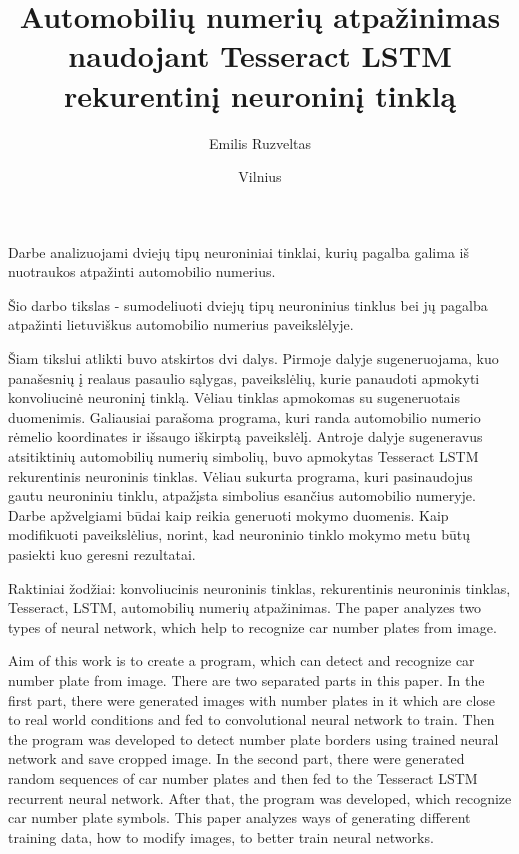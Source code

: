 \documentclass{VUMIFInfBakalaurinis}
\title{Automobilių numerių atpažinimas naudojant Tesseract LSTM rekurentinį neuroninį tinklą}
\author{Emilis Ruzveltas}
\date{Vilnius \\ \the\year}
\begin{document}
\maketitle
\setcounter{page}{2}
Darbe analizuojami dviejų tipų neuroniniai tinklai, kurių pagalba galima iš nuotraukos atpažinti automobilio numerius.

Šio darbo tikslas - sumodeliuoti dviejų tipų neuroninius tinklus bei jų pagalba atpažinti lietuviškus automobilio numerius paveikslėlyje.

Šiam tikslui atlikti buvo atskirtos dvi dalys. Pirmoje dalyje sugeneruojama, kuo panašesnių į realaus pasaulio sąlygas,
paveikslėlių, kurie panaudoti apmokyti konvoliucinė neuroninį tinklą. Vėliau tinklas apmokomas su sugeneruotais duomenimis.
Galiausiai parašoma programa, kuri randa automobilio numerio rėmelio koordinates ir išsaugo iškirptą paveikslėlį.
Antroje dalyje sugeneravus atsitiktinių automobilių numerių simbolių, buvo apmokytas Tesseract LSTM rekurentinis neuroninis
tinklas. Vėliau sukurta programa, kuri pasinaudojus gautu neuroniniu tinklu, atpažįsta simbolius esančius automobilio numeryje.
Darbe apžvelgiami būdai kaip reikia generuoti mokymo duomenis. Kaip modifikuoti paveikslėlius, norint,
kad neuroninio tinklo mokymo metu būtų pasiekti kuo geresni rezultatai.

Raktiniai žodžiai: konvoliucinis neuroninis tinklas, rekurentinis neuroninis tinklas, Tesseract, LSTM, automobilių numerių atpažinimas.
\newpage
{}
The paper analyzes two types of neural network, which help to recognize car number plates from image.

Aim of this work is to create a program, which can detect and recognize car number plate from image.
There are two separated parts in this paper. In the first part, there were generated images with number plates in it 
which are close to real world conditions and fed to convolutional neural network to train. Then the program was developed to 
detect number plate borders using trained neural network and save cropped image.
In the second part, there were generated random sequences of car number plates and then fed to the Tesseract LSTM recurrent 
neural network. After that, the program was developed, which recognize car number plate symbols.
This paper analyzes ways of generating different training data, how to modify images, to better train neural networks.
\end{document}
